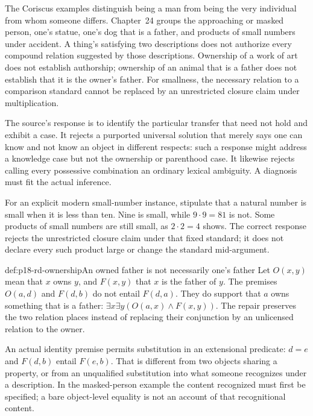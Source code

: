 The Coriscus examples distinguish being a man from being the very
individual from whom someone differs. Chapter~24 groups the approaching
or masked person, one's statue, one's dog that is a father, and products
of small numbers under accident. A thing's satisfying two descriptions
does not authorize every compound relation suggested by those descriptions.
Ownership of a work of art does not establish authorship; ownership
of an animal that is a father does not establish that it is the owner's
father. For smallness, the necessary relation to a comparison standard
cannot be replaced by an unrestricted closure claim under multiplication.

The source's response is to identify the particular transfer that need
not hold and exhibit a case. It rejects a purported universal solution
that merely says one can know and not know an object in different
respects: such a response might address a knowledge case but not the
ownership or parenthood case. It likewise rejects calling every
possessive combination an ordinary lexical ambiguity. A diagnosis must
fit the actual inference.

For an explicit modern small-number instance, stipulate that a natural
number is small when it is less than ten. Nine is small, while
\(9\cdot9=81\) is not. Some products of small numbers are still
small, as \(2\cdot2=4\) shows. The correct response rejects the
unrestricted closure claim under that fixed standard; it does not
declare every such product large or change the standard mid-argument.

\begin{hbexample}{def:p18-rd-ownership}{An owned father is not necessarily one's father}
Let \(O(x,y)\) mean that \(x\) owns \(y\), and \(F(x,y)\)
that \(x\) is the father of \(y\). The premises
\(O(a,d)\) and \(F(d,b)\) do not entail \(F(d,a)\).
They do support that \(a\) owns something that is a father:
\(\exists x\exists y(O(a,x)\land F(x,y))\).
The repair preserves the two relation places instead of replacing
their conjunction by an unlicensed relation to the owner.
\end{hbexample}

An actual identity premise permits substitution in an extensional
predicate: \(d=e\) and \(F(d,b)\) entail \(F(e,b)\).
That is different from two objects sharing a property, or from an
unqualified substitution into what someone recognizes under a description.
In the masked-person example the content recognized must first be
specified; a bare object-level equality is not an account of that
recognitional content.

